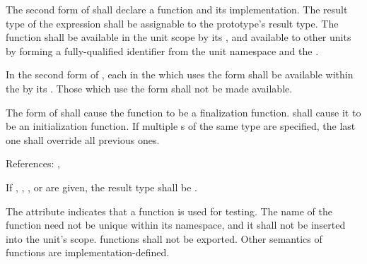 \specsubsubitem
The second form of  shall declare a function
and its implementation. The result type of the expression shall be assignable
to the prototype's result type. The function shall be available in the unit
scope by its , and available to other units by forming a
fully-qualified identifier from the unit namespace and the .

\specsubsubitem
In the second form of , each
 in the  which uses the
 form shall be available within the 
by its . Those which use the \terminal{\_} form shall not be
made available.

\specsubsubitem
The  form of  shall cause the
function to be a finalization function.  shall cause it to be an
initialization function. If multiple s of the same type
are specified, the last one shall override all previous ones.

References: , 

\specsubsubitem
If , , , or
 are given, the result type shall be .

\specsubsubitem
The  attribute indicates that a function is used for testing.
The name of the function need not be unique within its namespace, and it shall
not be inserted into the unit's scope.  functions shall not be
exported. Other semantics of  functions are
implementation-defined.


\begin{grammar}
\\
	 \\

\\
	\\
	 \\

\\
	  \terminal{;}\\
	  \terminal{=}  \terminal{;}\\
	  \terminal{::} \terminal{\{}  \terminal{\}} \terminal{;}\\

\\
	 \optional{\terminal{,}}\\
	 \terminal{,} \\
\end{grammar}

